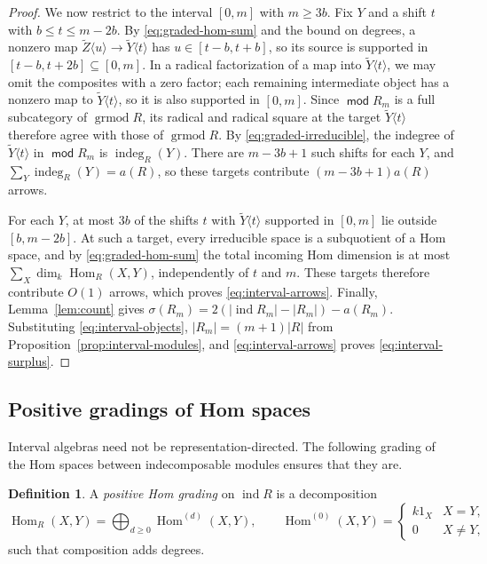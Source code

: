 \documentclass[a4paper,reqno,10pt]{amsart}
\theoremstyle{definition}
\newtheorem{definition}[theorem]{Definition}
\numberwithin{equation}{section}
\DeclareMathOperator{\moduleCategory}{\mathsf{mod}}
\renewcommand{\mod}{\moduleCategory}
\DeclareMathOperator{\ind}{ind}
\DeclareMathOperator{\Hom}{Hom}
\begin{document}
\begin{proof}
We now restrict to the interval \([0,m]\) with \(m\geq3b\). Fix \(Y\) and a
shift \(t\) with \(b\leq t\leq m-2b\). By \eqref{eq:graded-hom-sum} and
the bound on degrees, a nonzero map \(\widetilde Z\langle u\rangle\to \widetilde Y\langle t\rangle\) has
\(u\in[t-b,t+b]\), so its source is supported in
\([t-b,t+2b]\subseteq[0,m]\). In a radical factorization of a map into
\(\widetilde Y\langle t\rangle\), we may omit the composites with a zero factor;
each remaining intermediate object has a nonzero map to
\(\widetilde Y\langle t\rangle\), so it is also supported in \([0,m]\). Since
\(\mod R_m\) is a full subcategory of \(\operatorname{grmod}R\), its
radical and radical square at the target \(\widetilde Y\langle t\rangle\) therefore
agree with those of \(\operatorname{grmod}R\). By
\eqref{eq:graded-irreducible}, the indegree of \(\widetilde Y\langle t\rangle\) in
\(\mod R_m\) is \(\operatorname{indeg}_R(Y)\). There are \(m-3b+1\) such
shifts for each \(Y\), and \(\sum_Y\operatorname{indeg}_R(Y)=a(R)\), so
these targets contribute \((m-3b+1)a(R)\) arrows.

For each \(Y\), at most \(3b\) of the shifts \(t\) with
\(\widetilde Y\langle t\rangle\) supported in \([0,m]\) lie outside \([b,m-2b]\).
At such a target, every irreducible space is a subquotient of a Hom space,
and by \eqref{eq:graded-hom-sum} the total incoming Hom dimension is at
most \(\sum_X\dim_k\Hom_R(X,Y)\), independently of \(t\) and \(m\). These
targets therefore contribute \(O(1)\) arrows, which proves
\eqref{eq:interval-arrows}. Finally, Lemma~\ref{lem:count} gives
\(\sigma(R_m)=2(|\ind R_m|-|R_m|)-a(R_m)\). Substituting
\eqref{eq:interval-objects}, \(|R_m|=(m+1)|R|\) from
Proposition~\ref{prop:interval-modules}, and
\eqref{eq:interval-arrows} proves \eqref{eq:interval-surplus}.
\end{proof}

\subsection{Positive gradings of Hom spaces}\label{subsec:graded-hom}
Interval algebras need not be representation-directed. The following
grading of the Hom spaces between indecomposable modules ensures that
they are.
\begin{definition}\label{def:positive-hom-grading}
A \emph{positive Hom grading} on \(\ind R\) is a decomposition
\[
 \Hom_R(X,Y)=\bigoplus_{d\geq0}\Hom^{(d)}(X,Y),\qquad
 \Hom^{(0)}(X,Y)=\begin{cases}k1_X&X=Y,\\0&X\ne Y,\end{cases}
\]
such that composition adds degrees.
\end{definition}
\end{document}
